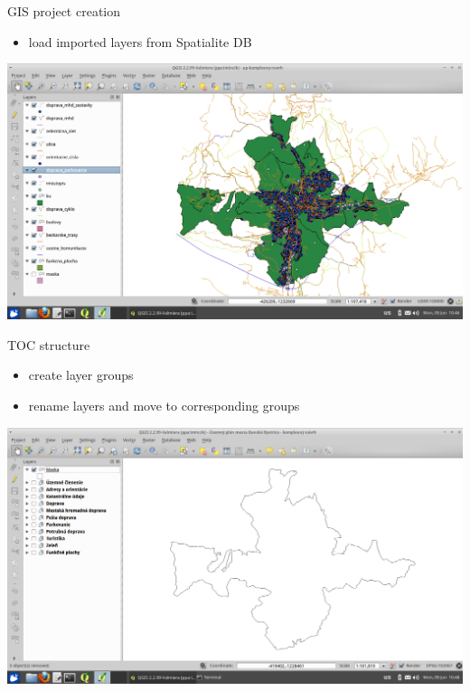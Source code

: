 \documentclass[12pt]{beamer}
\begin{document}
\begin{frame}{GIS project creation}
	\begin{itemize}
		\item load imported layers from Spatialite DB
	\end{itemize}
	\begin{center}
		\includegraphics[keepaspectratio=true,height=0.6\textheight]{images/real-world-example/project-load-layers.png}
	\end{center}
\end{frame}


\begin{frame}{TOC structure}
	\begin{itemize}
		\item create layer groups
		\item rename layers and move to corresponding groups
	\end{itemize}
	\begin{center}
		\includegraphics[keepaspectratio=true,height=0.6\textheight]{images/real-world-example/project-create-layer-groups.png}
	\end{center}
\end{frame}
\end{document}
